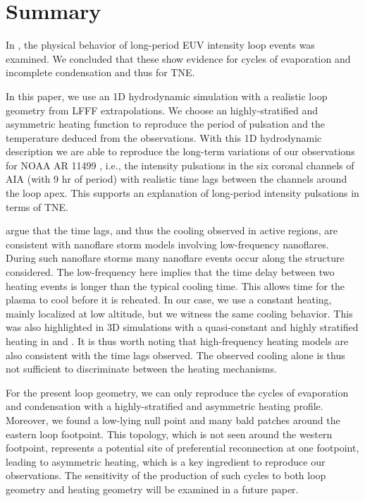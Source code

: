 \documentclass[preprint2]{aastex6}
\begin{document}
\bigskip

\section{Summary}\label{sec:summary}

In \citet{froment2015}, the physical behavior of long-period EUV intensity loop events was examined. We concluded that these show evidence for cycles of evaporation and incomplete condensation and thus for TNE. 

In this paper, we use an 1D hydrodynamic simulation with a realistic loop geometry from LFFF extrapolations.
We choose an highly-stratified and asymmetric heating function to reproduce the period of pulsation and the temperature deduced from the observations. 
With this 1D hydrodynamic description we are able to reproduce the long-term variations of our observations for NOAA AR 11499 \citep{froment2015}, i.e., the intensity pulsations in the six coronal channels of AIA (with 9 hr of period) with realistic time lags between the channels around the loop apex. 
This supports an explanation of long-period intensity pulsations in terms of TNE.

\citealp{viall&klimchuk2011, viall&klimchuk2012,viall&klimchuk2013} argue that the time lags, and thus the cooling observed in active regions, are consistent with nanoflare storm models involving low-frequency nanoflares. During such nanoflare storms many nanoflare events occur along the structure considered. The low-frequency here implies that the time delay between two heating events is longer than the typical cooling time. This allows time for the plasma to cool before it is reheated.
In our case, we use a constant heating, mainly localized at low altitude, but we witness the same cooling behavior. This was also highlighted in 3D simulations with a quasi-constant and highly stratified heating in \citet{lionello2013,lionello2016} and \citet{winebarger_investigation_2016}. 
It is thus worth noting that high-frequency heating models are also consistent with the time lags observed.
The observed cooling alone is thus not sufficient to discriminate between the heating mechanisms.

For the present loop geometry, we can only reproduce the cycles of evaporation and condensation with a highly-stratified and asymmetric heating profile. Moreover, we found a low-lying null point and many bald patches around the eastern loop footpoint. This topology, which is not seen around the western footpoint, represents a potential site of preferential reconnection at one footpoint, leading to asymmetric heating, which is a key ingredient to reproduce our observations. The sensitivity of the production of such cycles to both loop geometry and heating geometry will be examined in a future paper. 
\end{document}
